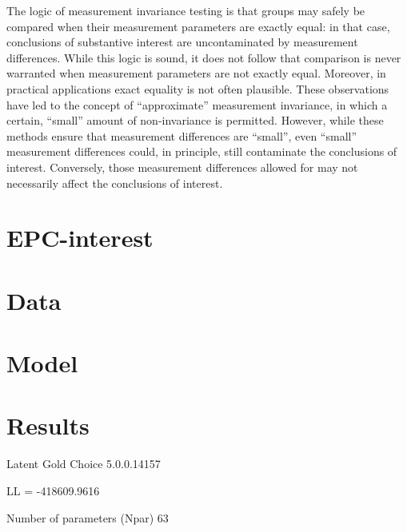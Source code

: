 \documentclass[letterpaper,12pt]{article}
\begin{document}
\noindent


The logic of measurement invariance testing is that groups may safely be compared when their measurement parameters are exactly equal: in that case, conclusions of substantive interest are uncontaminated by measurement differences. While this logic is sound, it does not follow that comparison is never warranted when measurement parameters are not exactly equal. Moreover, in practical applications exact equality is not often plausible. These observations have led to the concept of ``approximate'' measurement  invariance, in which a certain, ``small'' amount of non-invariance is permitted. 
However, while these methods ensure that measurement differences are ``small'', even ``small'' measurement differences could, in principle, still contaminate the conclusions of interest. Conversely, those measurement differences allowed for may not necessarily affect the conclusions of interest. 



\section{EPC-interest}

\section{Data}
\section{Model}
\section{Results}

Latent Gold Choice 5.0.0.14157

LL = -418609.9616

Number of parameters (Npar)	63
\end{document}
